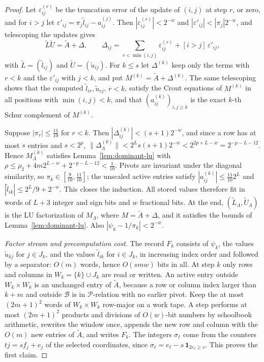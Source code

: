 \begin{proof}
Let $\varepsilon^{(r)}_{ij}$ be the truncation error of the update of $(i,j)$
at step $r$, or zero, and for $i>j$ let
$\varepsilon'_{ij}=\pi_j\tilde l_{ij}-a^{(j)}_{ij}$. Then
$|\varepsilon^{(r)}_{ij}|<2^{-w}$ and $|\varepsilon'_{ij}|<|\pi_j|2^{-w}$, and
telescoping the updates gives
\[
 \widetilde L\widetilde U=\widetilde A+\Delta,\qquad
 \Delta_{ij}=\sum_{r<\min(i,j)}\varepsilon^{(r)}_{ij}+[i>j]\,\varepsilon'_{ij},
\]
with $\widetilde L=(\tilde l_{ij})$ and $\widetilde U=(\tilde u_{ij})$. For
$k\le s$ let $\Delta^{(k)}$ keep only the terms with $r<k$ and the
$\varepsilon'_{ij}$ with $j<k$, and put $M^{(k)}=\widetilde A+\Delta^{(k)}$. The
same telescoping shows that the computed $\tilde l_{ir},\tilde u_{rj}$,
$r<k$, satisfy the Crout equations of $M^{(k)}$ in all positions with
$\min(i,j)<k$, and that $(a^{(k)}_{ij})_{i,j\ge k}$ is the exact $k$-th Schur
complement of $M^{(k)}$.

Suppose $|\pi_r|\le\frac{11}{10}$ for $r<k$. Then $|\Delta^{(k)}_{ij}|<(s+1)2^{-w}$,
and since a row has at most $s$ entries and $s<2^p$,
$\|\Delta^{(k)}_\Lambda\|<2^Ls(s+1)2^{-w}<2^{2p+L-w}=2^{-p-L-12}$. Hence
$M^{(k)}_\Lambda$ satisfies Lemma~\ref{lem:dominant-lu} with
$\rho\le\rho_2+4m2^{L-w}+2^{-p-L-12}<\frac1{10}$. Pivots are invariant under the
diagonal similarity, so $\pi_k\in[\frac9{10},\frac{11}{10}]$; the unscaled
active entries satisfy $|a^{(k)}_{ij}|\le\frac{11}{10}2^L$ and
$|\tilde l_{ik}|\le2^L/9+2^{-w}$. This closes the induction. All stored values
therefore fit in words of $L+3$ integer and sign bits and $w$ fractional bits.
At the end, $(\widetilde L_\Lambda,\widetilde U_\Lambda)$ is the LU factorization
of $M_\Lambda$, where $M=\widetilde A+\Delta$, and it satisfies the bounds of
Lemma~\ref{lem:dominant-lu}. Also $|\psi_k-1/\pi_k|<2^{-w}$.

\emph{Factor stream and precomputation cost.} The record $F_k$ consists of
$\psi_k$, the values $\tilde u_{kj}$ for $j\in J_k$, and the values
$\tilde l_{ik}$ for $i\in J_k$, in increasing index order and followed by a
separator: $O(m)$ words, hence $O(smw)$ bits in all. At step $k$ only rows and
columns in $W_k=\{k\}\cup J_k$ are read or written. An active entry outside
$W_k\times W_k$ is an unchanged entry of $\widetilde A$, because a row or
column index larger than $k+m$ and outside $\mathcal B$ is in
$\mathcal P$-relation with no earlier pivot. Keep the at most $(2m+1)^2$ words
of $W_k\times W_k$ row-major on a work tape. A step performs at most
$(2m+1)^2$ products and divisions of $O(w)$-bit numbers by schoolbook
arithmetic, rewrites the window once, appends the new row and column with the
$O(m)$ new entries of $\widetilde A$, and writes $F_k$. The integers
$\sigma_\ell$ come from the counters $tj=sf_j+e_j$ of the selected coordinates,
since $\sigma_\ell=e_\ell-s\,\mathbf 1_{2e_\ell\ge s}$. This proves the first
claim.


\end{proof}
